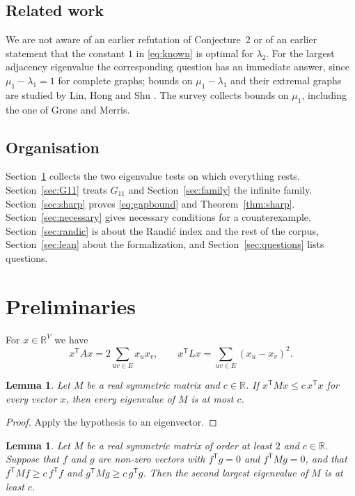 \documentclass[11pt]{amsart}
\newtheorem{lemma}[theorem]{Lemma}
\theoremstyle{definition}
\theoremstyle{remark}
\newcommand{\R}{\mathbb{R}}
\newcommand{\tr}{^{\mathsf{T}}}
\begin{document}
\subsection*{Related work}
We are not aware of an earlier refutation of Conjecture~2 or of an earlier statement that the
constant $1$ in \eqref{eq:known} is optimal for $\lambda_2$. For the largest adjacency eigenvalue
the corresponding question has an immediate answer, since $\mu_1-\lambda_1=1$ for complete
graphs; bounds on $\mu_1-\lambda_1$ and their extremal graphs are studied by Lin, Hong and Shu
\cite{LinHongShu}. The survey \cite{Zhang} collects bounds on $\mu_1$, including the one of
Grone and Merris.

\subsection*{Organisation}
Section~\ref{sec:prelim} collects the two eigenvalue tests on which everything rests.
Section~\ref{sec:G11} treats $G_{11}$ and Section~\ref{sec:family} the infinite family.
Section~\ref{sec:sharp} proves \eqref{eq:gapbound} and Theorem~\ref{thm:sharp}.
Section~\ref{sec:necessary} gives necessary conditions for a counterexample.
Section~\ref{sec:randic} is about the Randi\'c index and the rest of the corpus,
Section~\ref{sec:lean} about the formalization, and Section~\ref{sec:questions} lists questions.

\section{Preliminaries}\label{sec:prelim}

For $x\in\R^{V}$ we have
\begin{equation}\label{eq:forms}
x\tr Ax=2\sum_{uv\in E}x_ux_v,\qquad x\tr Lx=\sum_{uv\in E}(x_u-x_v)^2 .
\end{equation}

\begin{lemma}\label{lem:upper}
Let $M$ be a real symmetric matrix and $c\in\R$. If $x\tr Mx\le c\,x\tr x$ for every vector $x$,
then every eigenvalue of $M$ is at most $c$.
\end{lemma}

\begin{proof}
Apply the hypothesis to an eigenvector.
\end{proof}

\begin{lemma}\label{lem:two}
Let $M$ be a real symmetric matrix of order at least $2$ and $c\in\R$. Suppose that $f$ and $g$
are non-zero vectors with $f\tr g=0$ and $f\tr Mg=0$, and that
$f\tr Mf\ge c\,f\tr f$ and $g\tr Mg\ge c\,g\tr g$. Then the second largest eigenvalue of $M$ is at
least $c$.
\end{lemma}
\end{document}
